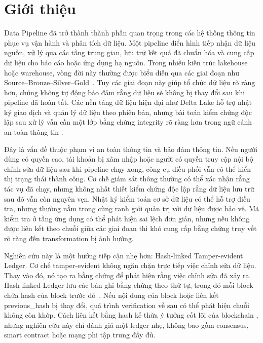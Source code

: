 \section{Giới thiệu}\label{sec:gioithieu}

Data Pipeline đã trở thành thành phần quan trọng trong các hệ thống
thông tin phục vụ vận hành và phân tích dữ liệu. Một pipeline điển hình
tiếp nhận dữ liệu nguồn, xử lý qua các tầng trung gian, lưu trữ kết quả
đã chuẩn hóa và cung cấp dữ liệu cho báo cáo hoặc ứng dụng hạ nguồn.
Trong nhiều kiến trúc lakehouse hoặc warehouse, vòng đời này thường được
biểu diễn qua các giai đoạn như Source--Bronze--Silver--Gold~\citep{databricksMedallion}. Tuy các giai đoạn
này giúp tổ chức dữ liệu rõ ràng hơn, chúng không tự động bảo đảm rằng
dữ liệu sẽ không bị thay đổi sau khi pipeline đã hoàn tất. Các nền tảng
dữ liệu hiện đại như Delta Lake hỗ trợ nhật ký giao dịch và quản lý dữ
liệu theo phiên bản, nhưng bài toán kiểm chứng độc lập sau xử lý vẫn cần
một lớp bằng chứng integrity rõ ràng hơn trong ngữ cảnh an toàn thông
tin \citep{databricksDelta,iso27001}.

Đây là vấn đề thuộc phạm vi an toàn thông tin và bảo đảm thông tin. Nếu
người dùng có quyền cao, tài khoản bị xâm nhập hoặc người có quyền truy cập nội bộ chỉnh sửa dữ
liệu sau khi pipeline chạy xong, công cụ điều phối vẫn có thể hiển
thị trạng thái thành công. Cơ chế giám sát thông thường có thể xác nhận
rằng tác vụ đã chạy, nhưng không nhất thiết kiểm chứng độc lập rằng dữ liệu
lưu trữ sau đó vẫn còn nguyên vẹn. Nhật ký kiểm toán cơ sở dữ liệu có thể hỗ trợ điều
tra, nhưng thường nằm trong cùng ranh giới quản trị với dữ liệu được bảo
vệ. Mã kiểm tra ở tầng ứng dụng có thể phát hiện sai lệch đơn giản, nhưng
nếu không được liên kết theo chuỗi giữa các giai đoạn thì khó cung cấp bằng
chứng truy vết rõ ràng đến transformation bị ảnh hưởng.

Nghiên cứu này là một hướng tiếp cận nhẹ hơn: Hash-linked
Tamper-evident Ledger. Cơ chế tamper-evident không ngăn chặn trực tiếp
việc chỉnh sửa dữ liệu. Thay vào đó, nó tạo ra bằng chứng để phát hiện
rằng việc chỉnh sửa đã xảy ra. Hash-linked Ledger lưu các bản ghi bằng
chứng theo thứ tự, trong đó mỗi block chứa hash của block trước đó~\citep{merkle1978}. Nếu
nội dung của block hoặc liên kết previous\_hash bị thay đổi, quá trình
verification về sau có thể phát hiện chuỗi không còn khớp. Cách liên kết
bằng hash kế thừa ý tưởng cốt lõi của blockchain
\citep{nakamoto2008bitcoin}, nhưng nghiên cứu này chỉ đánh giá một ledger
nhẹ, không bao gồm consensus, smart contract hoặc mạng phi tập trung đầy
đủ.

